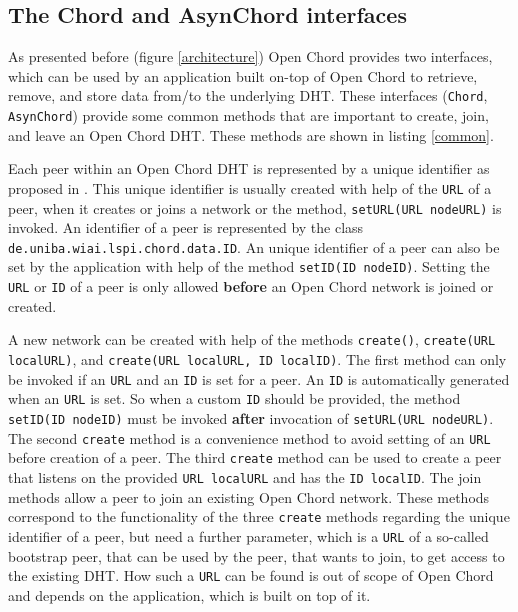 \subsection{The Chord and AsynChord interfaces}\label{interfaces} 
As presented before (figure \ref{architecture}) Open Chord provides two interfaces, 
which can be used by an application built on-top of Open Chord to retrieve, 
remove, and store data from/to the underlying DHT. These interfaces ({\tt Chord}, 
{\tt AsynChord}) provide some common methods that are important to create, join, and 
leave an Open Chord DHT. These methods are shown in listing \ref{common}. 

Each peer within an Open Chord DHT is represented by a unique identifier as proposed 
in \cite{stoica01chord}. This unique identifier is usually created with help of 
the {\tt URL} of a peer, when it creates or joins a network or the method, 
{\tt setURL(URL nodeURL)} is invoked. An identifier of a peer is represented by 
the class {\tt de.\-uniba.\-wiai.\-lspi.\-chord.\-data.\-ID}. An unique identifier 
of a peer can also be set by the application with help of the method {\tt setID(ID nodeID)}. Setting the {\tt URL} or {\tt ID} of a peer is only allowed {\bf before} 
an Open Chord network is joined or created. 

A new network can be created with help of the methods {\tt create()}, {\tt create(URL localURL)}, and {\tt create(URL localURL, ID localID)}. The first method can only be 
invoked if an {\tt URL} and an {\tt ID} is set for a peer. An {\tt ID} is automatically 
generated when an {\tt URL} is set. So when a custom {\tt ID} should be provided, the 
method {\tt setID(ID nodeID)} must be invoked {\bf after} invocation of 
{\tt setURL(URL nodeURL)}. The second {\tt create} method is a convenience method to 
avoid setting of an {\tt URL} before creation of a peer. The third {\tt create} method 
can be used to create a peer that listens on the provided {\tt URL localURL} and 
has the {\tt ID localID}.
%
%
The join methods allow a peer to join an existing 
Open Chord network. These methods correspond to the functionality of the three 
{\tt create} methods regarding the unique identifier of a peer, but need a further 
parameter, which is a {\tt URL} of a so-called bootstrap peer, that can be used 
by the peer, that wants to join, to get access to the existing DHT. How such a 
{\tt URL} can be found is out of scope of Open Chord and depends on the application, 
which is built on top of it. 

